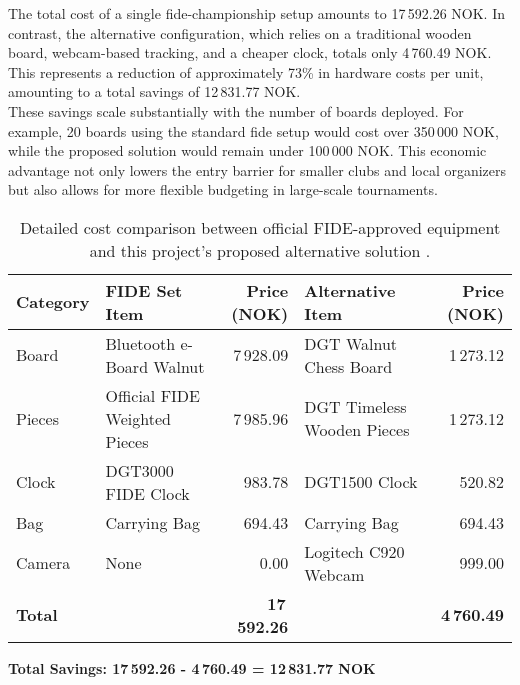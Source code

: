 The total cost of a single \gls{fide}-championship setup amounts to 17\,592.26 NOK. In contrast, the alternative configuration, which relies on a traditional wooden board, webcam-based tracking, and a cheaper clock, totals only 4\,760.49 NOK. This represents a reduction of approximately 73\% in hardware costs per unit, amounting to a total savings of 12\,831.77 NOK. \\

These savings scale substantially with the number of boards deployed. For example,  20 boards using the standard \gls{fide} setup would cost over 350\,000 NOK, while the proposed solution would remain under 100\,000 NOK. This economic advantage not only lowers the entry barrier for smaller clubs and local organizers but also allows for more flexible budgeting in large-scale tournaments. \\

\begin{table}[h!]
\centering
\caption[Detailed cost comparison]{Detailed cost comparison between official FIDE-approved equipment and this project's proposed alternative solution \cite{dgtshop:prices}.}
\label{tab:detailed-price-comparison}
\begin{tabular}{lL{4cm}rL{4cm}r}
\toprule
\textbf{Category} & \textbf{FIDE Set Item} & \textbf{Price (NOK)} & \textbf{Alternative Item} & \textbf{Price (NOK)} \\
\midrule
Board & Bluetooth e-Board Walnut & 7\,928.09 & DGT Walnut Chess Board & 1\,273.12 \\
Pieces & Official FIDE Weighted Pieces & 7\,985.96 & DGT Timeless Wooden Pieces & 1\,273.12 \\
Clock & DGT3000 FIDE Clock & 983.78 & DGT1500 Clock & 520.82 \\
Bag & Carrying Bag & 694.43 & Carrying Bag & 694.43 \\
Camera & None & 0.00 & Logitech C920 Webcam & 999.00 \\
\midrule
\textbf{Total} & & \textbf{17\,592.26} & & \textbf{4\,760.49} \\
\bottomrule
\end{tabular}
\vspace{0.3cm}

\textbf{Total Savings: 17\,592.26 - 4\,760.49 = 12\,831.77 NOK}
\end{table}

